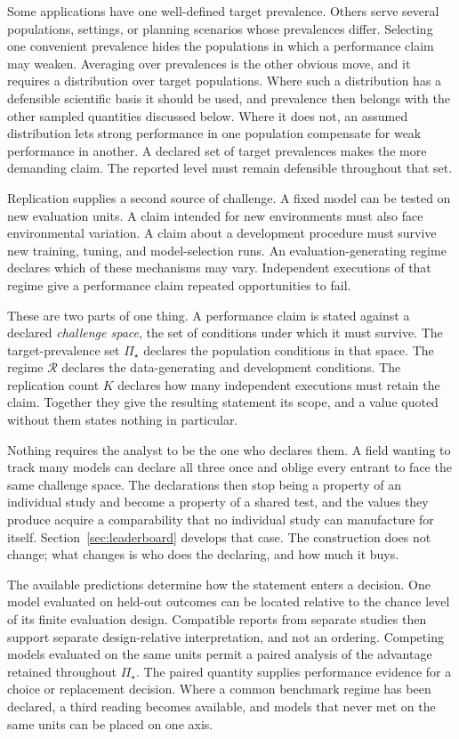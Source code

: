 \documentclass[11pt]{article}
\newcommand{\Regime}{\mathcal{R}}
\newcommand{\PSet}{\Pi_\star}
\theoremstyle{remark}
\begin{document}
Some applications have one well-defined target prevalence. Others serve several populations, settings, or planning scenarios whose prevalences differ. Selecting one convenient prevalence hides the populations in which a performance claim may weaken. Averaging over prevalences is the other obvious move, and it requires a distribution over target populations. Where such a distribution has a defensible scientific basis it should be used, and prevalence then belongs with the other sampled quantities discussed below. Where it does not, an assumed distribution lets strong performance in one population compensate for weak performance in another. A declared set of target prevalences makes the more demanding claim. The reported level must remain defensible throughout that set.

Replication supplies a second source of challenge. A fixed model can be tested on new evaluation units. A claim intended for new environments must also face environmental variation. A claim about a development procedure must survive new training, tuning, and model-selection runs. An evaluation-generating regime declares which of these mechanisms may vary. Independent executions of that regime give a performance claim repeated opportunities to fail.

These are two parts of one thing. A performance claim is stated against a declared \emph{challenge space}, the set of conditions under which it must survive. The target-prevalence set $\PSet$ declares the population conditions in that space. The regime $\Regime$ declares the data-generating and development conditions. The replication count $K$ declares how many independent executions must retain the claim. Together they give the resulting statement its scope, and a value quoted without them states nothing in particular.

Nothing requires the analyst to be the one who declares them. A field wanting to track many models can declare all three once and oblige every entrant to face the same challenge space. The declarations then stop being a property of an individual study and become a property of a shared test, and the values they produce acquire a comparability that no individual study can manufacture for itself. Section~\ref{sec:leaderboard} develops that case. The construction does not change; what changes is who does the declaring, and how much it buys.


The available predictions determine how the statement enters a decision. One model evaluated on held-out outcomes can be located relative to the chance level of its finite evaluation design. Compatible reports from separate studies then support separate design-relative interpretation, and not an ordering. Competing models evaluated on the same units permit a paired analysis of the advantage retained throughout $\PSet$. The paired quantity supplies performance evidence for a choice or replacement decision. Where a common benchmark regime has been declared, a third reading becomes available, and models that never met on the same units can be placed on one axis.
\end{document}
